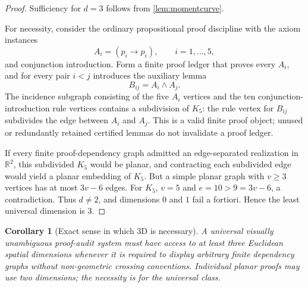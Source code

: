 \documentclass[11pt]{article}
\newcommand{\R}{\mathbb R}
\theoremstyle{plain}
\newtheorem{corollary}[theorem]{Corollary}
\theoremstyle{definition}
\theoremstyle{remark}
\begin{document}
\begin{proof}
Sufficiency for $d=3$ follows from \cref{lem:momentcurve}.

For necessity, consider the ordinary propositional proof discipline with the axiom instances
\[
  A_i=(p_i\to p_i),\qquad i=1,\ldots,5,
\]
and conjunction introduction.  Form a finite proof ledger that proves every $A_i$, and for every pair $i<j$ introduces the auxiliary lemma
\[
  B_{ij}=A_i\wedge A_j.
\]
The incidence subgraph consisting of the five $A_i$ vertices and the ten conjunction-introduction rule vertices contains a subdivision of $K_5$: the rule vertex for $B_{ij}$ subdivides the edge between $A_i$ and $A_j$.  This is a valid finite proof object; unused or redundantly retained certified lemmas do not invalidate a proof ledger.

If every finite proof-dependency graph admitted an edge-separated realization in $\R^2$, this subdivided $K_5$ would be planar, and contracting each subdivided edge would yield a planar embedding of $K_5$.  But a simple planar graph with $v\geq 3$ vertices has at most $3v-6$ edges.  For $K_5$, $v=5$ and $e=10>9=3v-6$, a contradiction.  Thus $d\neq 2$, and dimensions $0$ and $1$ fail a fortiori.  Hence the least universal dimension is $3$.
\end{proof}

\begin{corollary}[Exact sense in which 3D is necessary]
\label{cor:3dnecessary}
A universal visually unambiguous proof-audit system must have access to at least three Euclidean spatial dimensions whenever it is required to display arbitrary finite dependency graphs without non-geometric crossing conventions.  Individual planar proofs may use two dimensions; the necessity is for the universal class.
\end{corollary}
\end{document}
